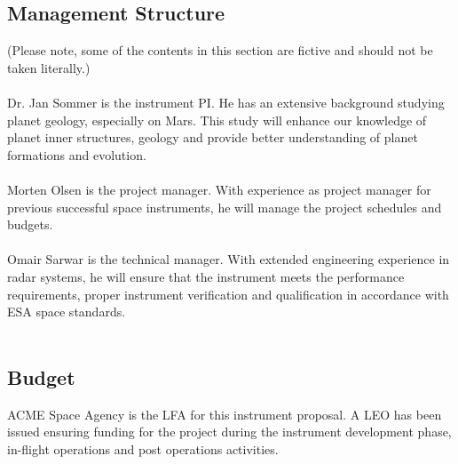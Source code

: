 \subsection{Management Structure}
(Please note, some of the contents in this section are fictive and should not be taken literally.)\\\\
%
\noindent
Dr. Jan Sommer is the instrument \ac{PI}. He has an extensive background studying planet geology, especially on Mars. This study will enhance our knowledge of planet inner structures, geology and provide better understanding of planet formations and evolution.\\\\
%
\noindent
Morten Olsen is the project manager. With experience as project manager for previous successful space instruments, he will manage the project schedules and budgets.\\\\
%
\noindent
Omair Sarwar is the technical manager. With extended engineering experience in radar systems, he will ensure that the instrument meets the performance requirements, proper instrument verification and qualification in accordance with ESA space standards.\\\\
%
\subsection{Budget}
ACME Space Agency is the \ac{LFA} for this instrument proposal. A \ac{LEO} has been issued ensuring funding for the project during the instrument development phase, in-flight operations and post operations activities.